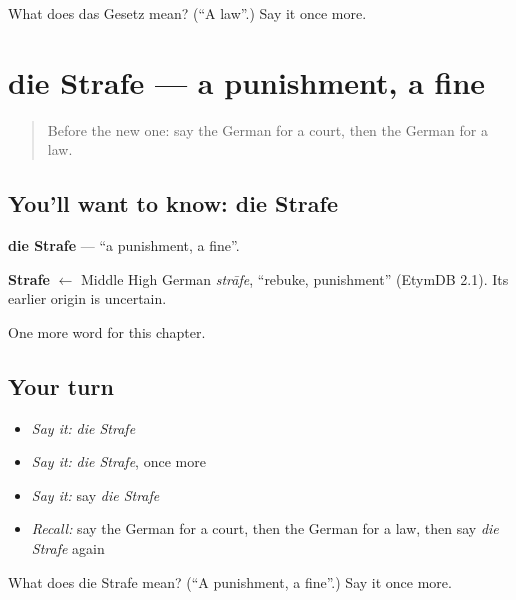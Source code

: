 \begin{tcolorbox}[breakable,colback=teal!4,colframe=teal!35!black,title={Before you move on}]
What does das Gesetz mean? (\textquotedblleft{}A law\textquotedblright{}.) Say it once more.
\end{tcolorbox}
\section[die Strafe]{die Strafe — a punishment, a fine}

\label{lesson:GE-C208-strafe}



\begin{quote}
Before the new one: say the German for a court, then the German for a law.
\end{quote}

\subsection*{You'll want to know: die Strafe}
\textbf{die Strafe} — \textquotedblleft{}a punishment, a fine\textquotedblright{}.

\begin{cousinweb}
\textbf{Strafe} $\leftarrow$ Middle High German \emph{strāfe}, \textquotedblleft{}rebuke, punishment\textquotedblright{} (EtymDB 2.1). Its earlier origin is uncertain.
\end{cousinweb}

\begin{grammarlens}[title={What you've built}]
One more word for this chapter.
\end{grammarlens}

\subsection*{Your turn}
\begin{itemize}
\raggedright
  \item \emph{Say it:} \emph{die Strafe}
  \item \emph{Say it:} \emph{die Strafe}, once more
  \item \emph{Say it:} say \emph{die Strafe}
  \item \emph{Recall:} say the German for a court, then the German for a law, then say \emph{die Strafe} again
\end{itemize}

\begin{tcolorbox}[breakable,colback=teal!4,colframe=teal!35!black,title={Before you move on}]
What does die Strafe mean? (\textquotedblleft{}A punishment, a fine\textquotedblright{}.) Say it once more.
\end{tcolorbox}
